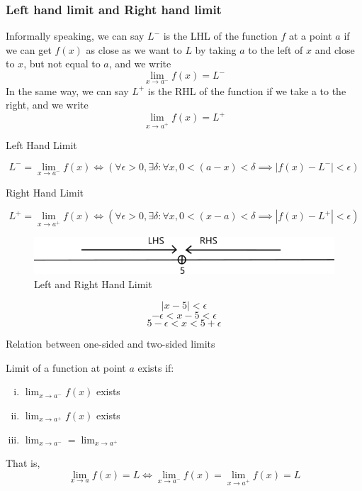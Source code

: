\documentclass[12pt]{article}
\begin{document}

\subsubsection{Left hand limit and Right hand limit}

Informally speaking, we can say $L^-$ is the LHL of the function $f$ at a point $a$ if we can get $f(x)$ as close as we want to $L$ by taking $a$ to the left of $x$ and close to $x$, but not equal to $a$, and we write \[
    \lim_{x \to a^-} f(x) = L^-
    \] In the same way, we can say $L^+$ is the RHL of the function if we take a to the right, and we write \[
    \lim_{x \to a^+} f(x) = L^+
\]

\begin{definition}{Left Hand Limit}

    \[ L^- = \lim_{x \to a^-} f(x) \iff \left( \forall\epsilon>0,\exists\delta : \forall x, 0<(a-x)<\delta \implies |f(x)-L^-|<\epsilon \right) \]
\end{definition}
\begin{definition}{Right Hand Limit}

\[
    L^+ = \lim_{x \to a^+} f(x) \iff \left( \forall\epsilon>0,\exists\delta : \forall x, 0<(x-a)<\delta \implies |f(x)-L^+|<\epsilon \right) 
\]
\end{definition}

\begin{figure}[htpb]
    \centering
    \includegraphics[scale=0.5]{Limit1.png}
    \caption{\small Left and Right Hand Limit}
\end{figure}
\[ |x-5| < \epsilon \]
\[ -\epsilon < x-5 < \epsilon \]
\[ 5-\epsilon < x < 5+\epsilon \]

\begin{theorem}{Relation between one-sided and two-sided limits}
    
    Limit of a function at point $a$ exists if:
    \begin{enumerate}[(i)]
        \item $\lim_{x \to a^-} f(x)$ exists
        \item $\lim_{x \to a^+} f(x)$ exists
        \item $\lim_{x \to a^-} = \lim_{x \to a^+}$ 
    \end{enumerate}
    That is, \[
        \lim_{x \to a} f(x) = L \iff \lim_{x \to a^-} f(x) = \lim_{x \to a^+} f(x) = L 
    \]
\end{theorem} \\~\\
\end{document}
